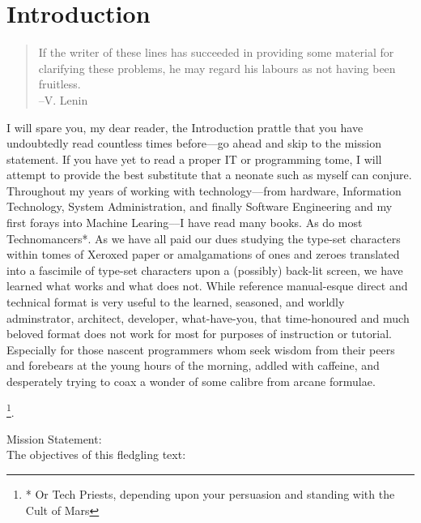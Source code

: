 \documentclass[oneside,12pt]{memoir} %
\begin{document}
\tableofcontents %


\chapter*{Introduction} %

\begin{quote}
If the writer of these lines has succeeded in providing some material for clarifying these problems, he may regard his labours as not having been fruitless.\\
--V. Lenin
\end{quote}

I will spare you, my dear reader, the Introduction prattle that you have undoubtedly read countless times before––go ahead and skip to the mission statement. If you have yet to read a proper IT or programming tome, I will attempt to provide the best substitute that a neonate such as myself can conjure. 
\\

Throughout my years of working with technology––from hardware, Information Technology, System Administration, and finally Software Engineering and my first forays into Machine Learing––I have read many books. As do most Technomancers*. As we have all paid our dues studying the type-set characters within tomes of Xeroxed paper or amalgamations of ones and zeroes translated into a fascimile of type-set characters upon a (possibly) back-lit screen, we have learned what works and what does not. While reference manual-esque direct and technical format is very useful to the learned, seasoned, and worldly adminstrator, architect, developer, what-have-you, that time-honoured and much beloved format does not work for most for purposes of instruction or tutorial. Especially for those nascent programmers whom seek wisdom from their peers and forebears at the young hours of the morning, addled with caffeine, and desperately trying to coax a wonder of some calibre from arcane formulae. 

\footnote{* Or Tech Priests, depending upon your persuasion and standing with the Cult of Mars}.

\large Mission Statement: \\
 The objectives of this fledgling text: \\
\end{document}

